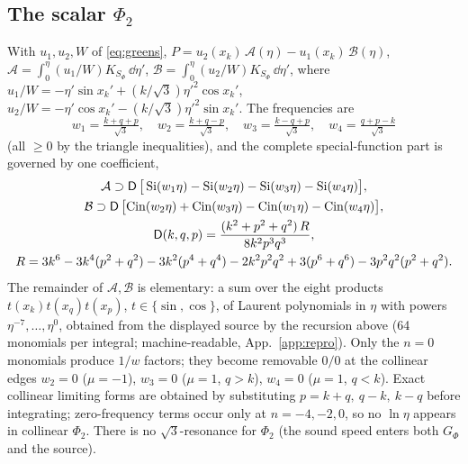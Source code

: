 {\subsection*{The scalar \texorpdfstring{$\Phi_2$}{Phi2}}
With $u_1,u_2,W$ of \eqref{eq:greens}, $P=u_2(x_k)\,\mathcal A(\eta)-u_1(x_k)\,\mathcal B(\eta)$, $\mathcal A=\int_0^\eta(u_1/W)K_{S_\Phi}\,\dd\eta'$,
$\mathcal B=\int_0^\eta(u_2/W)K_{S_\Phi}\,\dd\eta'$, where $u_1/W=-\eta'\sin x_k'+(k/\sqrt3){\eta'}^2\cos x_k'$, $u_2/W=-\eta'\cos x_k'-(k/\sqrt3){\eta'}^2\sin x_k'$.
The frequencies are
\begin{equation*}
w_1=\tfrac{k+q+p}{\sqrt3},\quad w_2=\tfrac{k+q-p}{\sqrt3},\quad w_3=\tfrac{k-q+p}{\sqrt3},\quad w_4=\tfrac{q+p-k}{\sqrt3}
\end{equation*}
(all $\ge0$ by the triangle inequalities),
and the complete special-function part is governed by one coefficient,
\begin{gather*}
\mathcal A\supset\mathsf D\,\big[\operatorname{Si}(w_1\eta)-\operatorname{Si}(w_2\eta)-\operatorname{Si}(w_3\eta)-\operatorname{Si}(w_4\eta)\big],\\
\mathcal B\supset\mathsf D\,\big[\mathrm{Cin}(w_2\eta)+\mathrm{Cin}(w_3\eta)-\mathrm{Cin}(w_1\eta)-\mathrm{Cin}(w_4\eta)\big],\\
\mathsf D(k,q,p)=\frac{(k^2+p^2+q^2)\,R}{8k^2p^3q^3},\\
R=3k^6-3k^4(p^2+q^2)-3k^2(p^4+q^4)-2k^2p^2q^2+3(p^6+q^6)-3p^2q^2(p^2+q^2).
\end{gather*}
The remainder of $\mathcal A,\mathcal B$ is elementary: a sum over the eight products $t(x_k)t(x_q)t(x_p)$, $t\in\{\sin,\cos\}$, of Laurent polynomials in
$\eta$ with powers $\eta^{-7},\ldots,\eta^0$, obtained from the displayed source by the recursion above (64 monomials per integral; machine-readable,
App.~\ref{app:repro}).  Only the $n=0$ monomials produce $1/w$ factors; they become removable $0/0$ at the collinear edges $w_2=0$ ($\mu=-1$),
$w_3=0$ ($\mu=1$, $q>k$), $w_4=0$ ($\mu=1$, $q<k$).  Exact collinear limiting forms are obtained by substituting $p=k+q,\ q-k,\ k-q$ before
integrating; zero-frequency terms occur only at $n=-4,-2,0$, so no $\ln\eta$ appears in collinear $\Phi_2$.  There is no $\sqrt3$-resonance for
$\Phi_2$ (the sound speed enters both $G_\Phi$ and the source).

}
